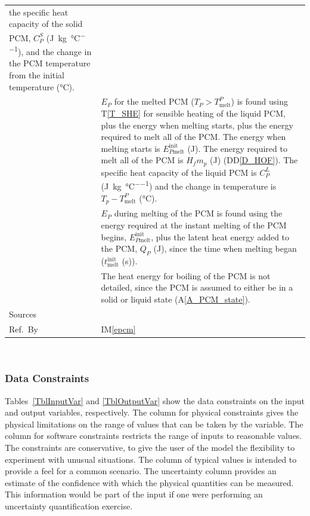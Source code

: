\documentclass[12pt]{article}
\newcommand{\colAwidth}{0.13\textwidth}
\newcommand{\colBwidth}{0.82\textwidth}
\newcommand{\ddref}[1]{DD\ref{#1}}
\newcommand{\tref}[1]{T\ref{#1}}
\newcommand{\aref}[1]{A\ref{#1}}
\newcommand{\iref}[1]{IM\ref{#1}}
\begin{document}
\begin{minipage}{\textwidth}
\begin{tabular}{| p{\colAwidth} | p{\colBwidth}|}
        the specific heat capacity of the solid PCM, $C_P^S$ (\si{\joule\per\kilogram\per\celsius}), and the change in the PCM temperature from the initial temperature (\si{\celsius}).\\
      &$E_P$ for the melted PCM ($T_P > T_\text{melt}^P$) is found using \tref{T_SHE}
        for sensible heating of the liquid PCM, plus the energy when melting starts,
        plus the energy required to melt all of
        the PCM.  The energy when melting starts is
        $E_{P\text{melt}}^{\text{init}}$ (\si{\joule}).  The energy required to melt all of the PCM is 
        $H_f m_p$ (\si{\joule}) (\ddref{D_HOF}).  The specific heat capacity of the liquid PCM is
        $C_P^L$ (\si{\joule\per\kilogram\per\celsius}) and the change in temperature is $T_p - T_\text{melt}^P$ (\si{\celsius}).\\
      &$E_P$ during melting of the PCM is found using the energy required at the
        instant melting of the PCM begins, 
        $E_{P\text{melt}}^{\text{init}}$, plus the latent heat energy added to
        the PCM, $Q_P$ (\si{\joule}), since the time when melting began ($t_\text{melt}^\text{init}$ (\si{\second})).\\
      &The heat energy for boiling of the PCM is not detailed, since the
        PCM is assumed 
        to either be in a solid or liquid state (\aref{A_PCM_state}).
  \\
  \hline
  Sources&~\cite{Lightstone2012} \ \\
  \hline
  Ref.\ By & \iref{epcm}\\
  \hline
\end{tabular}
\end{minipage}\\

\subsubsection{Data Constraints} \label{sec_DataConstraints}    

Tables~\ref{TblInputVar} and \ref{TblOutputVar} show the data constraints on the
input and output variables, respectively.  The column for physical constraints gives
the physical limitations on the range of values that can be taken by the
variable.  The column for software constraints restricts the range of inputs to
reasonable values.  The constraints are conservative, to give the user of the
model the flexibility to experiment with unusual situations.  The column of
typical values is intended to provide a feel for a common scenario.  The
uncertainty column provides an estimate of the confidence with which the
physical quantities can be measured.  This information would be part of the
input if one were performing an uncertainty quantification exercise.
\end{document}
